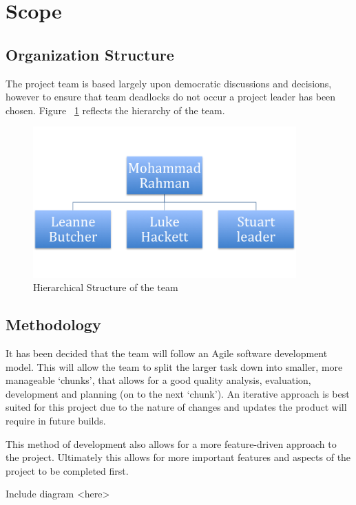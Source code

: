 \newpage
\section{Scope}
\subsection{Organization Structure}

The project team is based largely upon democratic discussions and decisions, however to ensure that team deadlocks do not occur a project leader has been chosen. Figure ~\ref{fig:org_hierachy} reflects the hierarchy of the team.


\begin{figure}[here]
\includegraphics[width=0.9\textwidth]{requirements/functional_requirements/org_hierachy.png}
\caption{Hierarchical Structure of the team}
\label{fig:org_hierachy}
\end{figure}


\subsection{Methodology}

It has been decided that the team will follow an Agile software development model. This will allow the team to split the larger task down into smaller, more manageable ‘chunks’, that allows for a good quality analysis, evaluation, development and planning (on to the next ‘chunk’). An iterative approach is best suited for this project due to the nature of changes and updates the product will require in future builds.

This method of development also allows for a more feature-driven approach to the project. Ultimately this allows for more important features and aspects of the project to be completed first. 

Include diagram <here>


